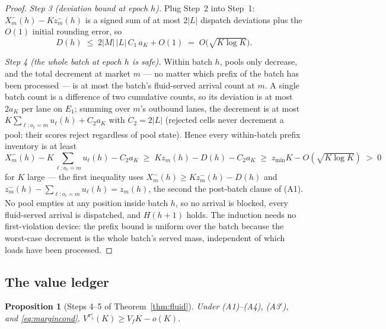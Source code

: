 \documentclass[11pt]{article}
\newtheorem{proposition}{Proposition}
\newcommand{\pol}{\pi_{\lambda}}
\begin{document}
\begin{proof}
\emph{Step 3 (deviation bound at epoch $h$).} Plug Step~2 into
Step~1: $X^{-}_m(h) - K z^{-}_m(h)$ is a signed sum of at most $2|L|$
dispatch deviations plus the $O(1)$ initial rounding error, so
\begin{equation}
  D(h) \;\leq\; 2 |M| \, |L| \, C_1\, a_K + O(1)
  \;=\; O\bigl( \sqrt{K \log K} \bigr).
\end{equation}

\emph{Step 4 (the whole batch at epoch $h$ is safe).} Within batch
$h$, pools only decrease, and the total decrement at market $m$ ---
no matter which prefix of the batch has been processed --- is at most
the batch's fluid-served arrival count at $m$. A single batch count
is a difference of two cumulative counts, so its deviation is at most
$2 a_K$ per lane on $E_1$; summing over $m$'s outbound lanes, the
decrement is at most
$K \sum_{\ell: o_{\ell} = m} u_{\ell}(h) + C_2 a_K$ with
$C_2 = 2|L|$ (rejected cells never decrement a pool: their scores
reject regardless of pool state). Hence every within-batch prefix
inventory is at least
\begin{equation}
  X^{-}_m(h) - K \textstyle\sum_{\ell: o_{\ell} = m} u_{\ell}(h)
  - C_2 a_K
  \;\geq\; K z_m(h) - D(h) - C_2 a_K
  \;\geq\; z_{\min} K - O(\sqrt{K \log K})
  \;>\; 0
\end{equation}
for $K$ large --- the first inequality uses
$X^{-}_m(h) \geq K z^{-}_m(h) - D(h)$ and
$z^{-}_m(h) - \sum_{\ell: o_{\ell}=m} u_{\ell}(h) = z_m(h)$, the
second the post-batch clause of (A1). No pool empties at
any position inside batch $h$, so no arrival is blocked, every
fluid-served arrival is dispatched, and $H(h{+}1)$ holds. The
induction needs no first-violation device: the prefix bound is
uniform over the batch because the worst-case decrement is the whole
batch's served mass, independent of which loads have been processed.
\end{proof}

\subsection{The value ledger}

\begin{proposition}[Steps 4--5 of Theorem~\ref{thm:fluid}]
\label{prop:ledger}
Under (A1)--(A4), (A3$'$), and \eqref{eq:margincond},
$V^{\pol^{\varepsilon}}(K) \geq V_f K - o(K)$.
\end{proposition}
\end{document}
